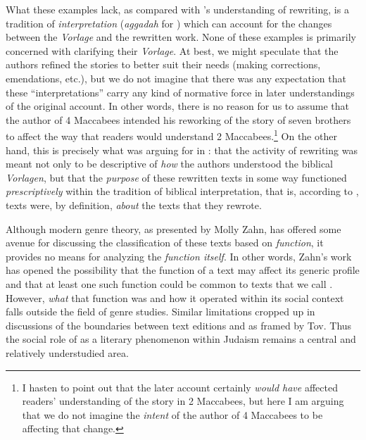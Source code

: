 What these examples lack, as compared with \vermes's understanding of rewriting, is a tradition of \emph{interpretation} (\emph{aggadah} for \vermes) which can account for the changes between the \emph{Vorlage} and the rewritten work. None of these examples is primarily concerned with clarifying their \emph{Vorlage}. At best, we might speculate that the authors refined the stories to better suit their needs (making corrections, emendations, etc.), but we do not imagine that there was any expectation that these ``interpretations'' carry any kind of normative force in later understandings of the original account. In other words, there is no reason for us to assume that the author of 4 Maccabees intended his reworking of the story of seven brothers to affect the way that readers would understand 2 Maccabees.\footnote{I hasten to point out that the later account certainly \emph{would have} affected readers' understanding of the story in 2 Maccabees, but here I am arguing that we do not imagine the \emph{intent} of the author of 4 Maccabees to be affecting that change.} On the other hand, this is precisely what \vermes was arguing for in : that the activity of rewriting was meant not only to be descriptive of \emph{how} the authors understood the biblical \emph{Vorlagen}, but that the \emph{purpose} of these rewritten texts in some way functioned \emph{prescriptively} within the tradition of biblical interpretation, that is, according to \vermes, \rwb texts were, by definition, \emph{about} the texts that they rewrote. 

Although modern genre theory, as presented by Molly Zahn, has offered some avenue for discussing the classification of these texts based on \emph{function}, it provides no means for analyzing the \emph{function itself}. In other words, Zahn's work has opened the possibility that the function of a text may affect its generic profile and that at least one such function could be common to texts that we call \rwb. However, \emph{what} that function was and how it operated within its social context falls outside the field of genre studies. Similar limitations cropped up in discussions of the boundaries between text editions and \rwb as framed by Tov. Thus the social role of \rwb as a literary phenomenon within \secondtemple Judaism remains a central and relatively understudied area.

